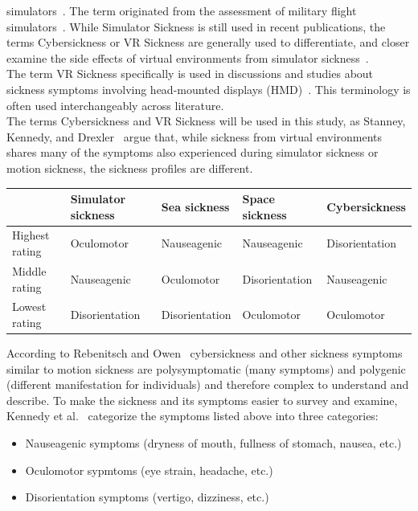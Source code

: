 simulators~\cite{Saredakis2020}.
The term originated from the assessment of military flight simulators~\cite{Kennedy1993}.
While Simulator Sickness is still used in recent publications, the terms Cybersickness or VR Sickness are generally used
to differentiate, and closer examine the side effects of virtual environments from simulator
sickness~\cite{Saredakis2020,McCauley1992}.
\\
The term VR Sickness specifically is used in discussions and studies about sickness symptoms involving head-mounted
displays (HMD)~\cite{Kim2018,Cobb1999}.
This terminology is often used interchangeably across literature.
\\
The terms Cybersickness and VR Sickness will be used in this study, as Stanney, Kennedy, and
Drexler~\cite{Stanney1997} argue that, while sickness from virtual environments shares many of the symptoms also
experienced during simulator sickness or motion sickness, the sickness profiles are different.
\\
\begin{center}
    \begin{tabular}{ l l l l l}
        \toprule
        \textbf{ } & \textbf{Simulator sickness} & \textbf{Sea sickness} & \textbf{Space sickness} &
        \textbf{Cybersickness} \\
        \midrule
        Highest rating & Oculomotor & Nauseagenic & Nauseagenic & Disorientation \\
        Middle rating & Nauseagenic & Oculomotor & Disorientation & Nauseagenic \\
        Lowest rating & Disorientation & Disorientation & Oculomotor & Oculomotor \\
        \bottomrule
    \end{tabular}
    \label{tab:symptom-profiles}
\end{center}
According to Rebenitsch and Owen~\cite{Rebenitsch2016} cybersickness and other sickness symptoms similar to motion
sickness are polysymptomatic (many symptoms) and polygenic (different manifestation for individuals) and therefore
complex to understand and describe.
To make the sickness and its symptoms easier to survey and examine, Kennedy et al.~\cite{Kennedy1993} categorize the
symptoms listed above into three categories:
\begin{itemize}
    \item Nauseagenic symptoms (dryness of mouth, fullness of stomach, nausea, etc.)
    \item Oculomotor sypmtoms (eye strain, headache, etc.)
    \item Disorientation symptoms (vertigo, dizziness, etc.)
\end{itemize}
